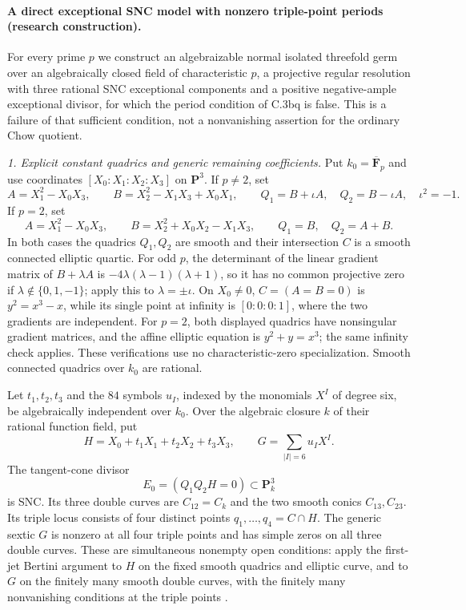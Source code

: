\paragraph{A direct exceptional SNC model with nonzero triple-point periods
(research construction).}
For every prime $p$ we construct an algebraizable normal isolated
threefold germ over an algebraically closed field of characteristic $p$,
a projective regular resolution with three rational SNC exceptional
components and a positive negative-ample exceptional divisor, for which
the period condition of C.3bq is false. This is a failure of that
sufficient condition, not a nonvanishing assertion for the ordinary
Chow quotient.

\emph{1. Explicit constant quadrics and generic remaining coefficients.}
Put $k_0=\overline{\mathbf F}_p$ and use coordinates
$[X_0:X_1:X_2:X_3]$ on $\mathbf P^3$.
If $p\ne2$, set
\[
 A=X_1^2-X_0X_3,\qquad
 B=X_2^2-X_1X_3+X_0X_1,
 \qquad Q_1=B+\iota A,\quad Q_2=B-\iota A,
 \quad \iota^2=-1.
\]
If $p=2$, set
\[
 A=X_1^2-X_0X_3,\qquad
 B=X_2^2+X_0X_2-X_1X_3,
 \qquad Q_1=B,\quad Q_2=A+B.
                                                        \tag{NP.1}
\]
In both cases the quadrics $Q_1,Q_2$ are smooth and their
intersection $C$ is a smooth connected elliptic quartic.
For odd $p$, the determinant of the linear gradient matrix of $B+\lambda A$ is
$-4\lambda(\lambda-1)(\lambda+1)$, so it has no common projective
zero if $\lambda\notin\{0,1,-1\}$; apply this to
$\lambda=\pm\iota$. On $X_0\ne0$, $C=(A=B=0)$ is
$y^2=x^3-x$, while its single point at infinity is
$[0:0:0:1]$, where the two gradients are independent.
For $p=2$, both displayed quadrics have nonsingular gradient matrices,
and the affine elliptic equation is $y^2+y=x^3$; the same infinity
check applies. These verifications use no characteristic-zero
specialization. Smooth connected quadrics over $k_0$ are rational.

Let $t_1,t_2,t_3$ and the $84$ symbols $u_I$, indexed by the
monomials $X^I$ of degree six, be algebraically independent over $k_0$.
Over the algebraic closure $k$ of their rational function field, put
\[
 H=X_0+t_1X_1+t_2X_2+t_3X_3,
 \qquad G=\sum_{|I|=6}u_I X^I.
                                                        \tag{NP.2}
\]
The tangent-cone divisor
\[
 E_0=(Q_1Q_2H=0)\subset\mathbf P^3_k
\]
is SNC. Its three double curves are $C_{12}=C_k$ and the two
smooth conics $C_{13},C_{23}$. Its triple locus consists of four
distinct points $q_1,\ldots,q_4=C\cap H$.
The generic sextic $G$ is nonzero at all four triple points and has
simple zeros on all three double curves. These are simultaneous
nonempty open conditions: apply the first-jet Bertini argument to
$H$ on the fixed smooth quadrics and elliptic curve, and to $G$ on
the finitely many smooth double curves, with the finitely many
nonvanishing conditions at the triple points
\citep[Lemma 33.47.3 and proof]{D_StacksBertiniUniformHigher}.

